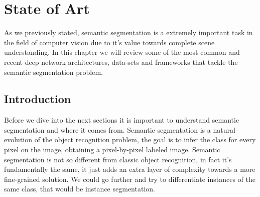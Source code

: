 
\chapter{State of Art}
\label{marcoteorico}
As we previously stated, semantic segmentation is a extremely important task in the field of computer vision due to it's value towards complete scene understanding.
In this chapter we will review some of the most common and recent deep network architectures, data-sets and frameworks that tackle the semantic segmentation problem.

\section{Introduction}
Before we dive into the next sections it is important to understand semantic segmentation and where it comes from. Semantic segmentation is a natural evolution of the object recognition problem, the goal is to infer the class for every pixel on the image, obtaining a pixel-by-pixel labeled image. 
Semantic segmentation is not so different from classic object recognition, in fact it's fundamentally the same, it just adds an extra layer of complexity towards a more fine-grained solution. We could go further and try to differentiate instances of the same class, that would be instance segmentation. 

